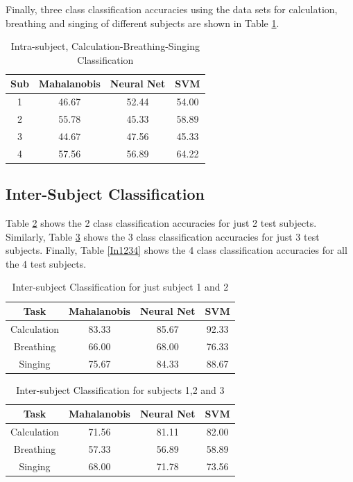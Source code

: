 \documentclass[11pt]{article}
\begin{document}
 		Finally, three class classification accuracies using the data sets for calculation, breathing and singing of different subjects are shown in Table \ref{ICBS}.
		\begin{table}[h!]
			\centering
			\caption{Intra-subject, Calculation-Breathing-Singing Classification}
			\label{ICBS}
			\begin{tabular}{c c c c}
				\hline
				Sub &Mahalanobis &Neural Net &SVM\\\hline
				1 &46.67 &52.44 &54.00\\
				2 &55.78 &45.33 &58.89\\
				3 &44.67 &47.56 &45.33\\
				4 &57.56 &56.89 &64.22\\
			\end{tabular}
		\end{table}
	\FloatBarrier
	\subsection{Inter-Subject Classification}
		Table \ref{In12} shows the 2 class classification accuracies for just 2 test subjects. Similarly, Table \ref{In123} shows the 3 class classification accuracies for just 3 test subjects. Finally, Table \ref{In1234} shows the 4 class classification accuracies for all the 4 test subjects.
		\begin{table}[h!]
			\centering
			\caption{Inter-subject Classification for just subject 1 and 2}
			\label{In12}
			\begin{tabular}{c c c c}
				\hline
				Task &Mahalanobis &Neural Net &SVM\\\hline
				Calculation &83.33 &85.67 &92.33\\
				Breathing &66.00 &68.00 &76.33\\
				Singing &75.67 &84.33 &88.67\\
			\end{tabular}
		\end{table}
		
		\begin{table}[h!]
			\centering
			\caption{Inter-subject Classification for subjects 1,2 and 3}
			\label{In123}
			\begin{tabular}{c c c c}
				\hline
				Task &Mahalanobis &Neural Net &SVM\\\hline
				Calculation &71.56 &81.11 &82.00\\
				Breathing &57.33 &56.89 &58.89\\
				Singing &68.00 &71.78 &73.56\\
			\end{tabular}
		\end{table}
		
\end{document}
